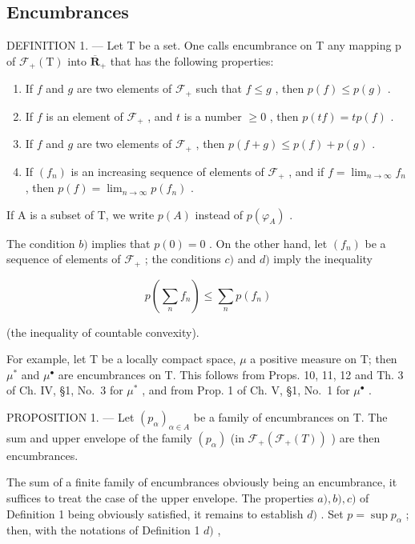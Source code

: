 \subsection{Encumbrances}

DEFINITION 1. --- Let T be a set. One calls encumbrance on T any mapping p of \(\mathcal{F}_{+}(\mathrm{T})\) into \(\overline{\mathbf{R}}_{+}\) that has the following properties:

\begin{enumerate}
\def\labelenumi{\alph{enumi})}
\item
  If \(f\) and \(g\) are two elements of \(\mathcal{F}_+\) such that \(f \leqslant g\) , then \(p(f) \leqslant p(g)\) .
\item
  If \(f\) is an element of \(\mathcal{F}_+\) , and \(t\) is a number \(\geqslant 0\) , then \(p(tf) = tp(f)\) .
\item
  If \(f\) and \(g\) are two elements of \(\mathcal{F}_+\) , then \(p(f + g) \leqslant p(f) + p(g)\) .
\item
  If \((f_n)\) is an increasing sequence of elements of \(\mathcal{F}_+\) , and if \(f = \lim_{n \to \infty} f_n\) , then \(p(f) = \lim_{n \to \infty} p(f_n)\) .
\end{enumerate}

If A is a subset of T, we write \(p(A)\) instead of \(p(\varphi_A)\) .

The condition \(b)\) implies that \(p(0) = 0\) . On the other hand, let \((f_n)\) be a sequence of elements of \(\mathcal{F}_+\) ; the conditions \(c)\) and \(d)\) imply the inequality

\[
p \left(\sum_ {n} f _ {n}\right) \leqslant \sum_ {n} p (f _ {n})
\]

(the inequality of countable convexity).

For example, let T be a locally compact space, \(\mu\) a positive measure on T; then \(\mu^{*}\) and \(\mu^{\bullet}\) are encumbrances on T. This follows from Props. 10, 11, 12 and Th. 3 of Ch. IV, §1, No.~3 for \(\mu^{*}\) , and from Prop. 1 of Ch. V, §1, No.~1 for \(\mu^{\bullet}\) .

PROPOSITION 1. --- Let \((p_{\alpha})_{\alpha \in A}\) be a family of encumbrances on T. The sum and upper envelope of the family \((p_{\alpha})\) (in \(\mathcal{F}_{+}(\mathcal{F}_{+}(T))\) ) are then encumbrances.

The sum of a finite family of encumbrances obviously being an encumbrance, it suffices to treat the case of the upper envelope. The properties \(a), b), c)\) of Definition 1 being obviously satisfied, it remains to establish \(d)\) . Set \(p = \sup p_{\alpha}\) ; then, with the notations of Definition 1 \(d)\) ,

